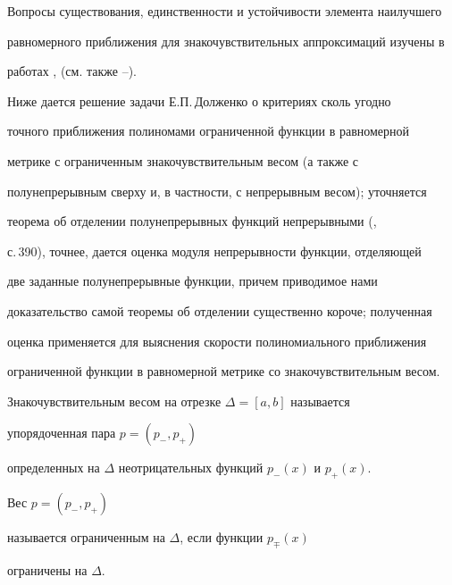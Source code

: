 




\maketitle


\label{begin}





Вопросы существования, единственности и устойчивости элемента наилучшего


равномерного приближения для знакочувствительных аппроксимаций изучены в


работах \cite{1}, \cite{2} (см. также \cite{3}--\cite{6}).


Ниже дается решение задачи Е.П.\,Долженко о критериях сколь угодно


точного приближения полиномами ограниченной функции в равномерной


метрике с ограниченным знакочувствительным весом (а также с


полунепрерывным сверху и, в частности, с непрерывным весом); уточняется


теорема об отделении полунепрерывных функций непрерывными (\cite{7},


с.\,390), точнее, дается оценка модуля непрерывности функции, отделяющей


две заданные полунепрерывные функции, причем приводимое нами


доказательство самой теоремы об отделении существенно короче; полученная


оценка применяется для выяснения скорости полиномиального приближения


ограниченной функции в равномерной метрике со знакочувствительным весом.





Знакочувствительным весом на отрезке $\Delta=[a,b]$ называется


упорядоченная пара $p=(p_-,p_+)$


определенных на $\Delta$ неотрицательных функций $p_-(x)$ и $p_+(x)$.


Вес $p=(p_-,p_+)$


называется ограниченным на $\Delta$, если функции $p_\mp(x)$


ограничены на $\Delta$.





